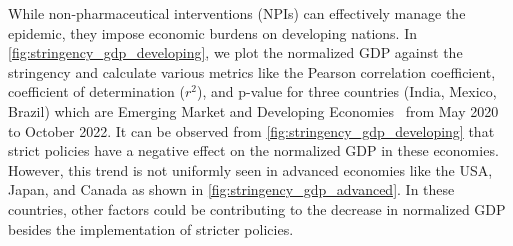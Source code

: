 \documentclass[tikz,fleqn,12pt]{wlscirep}
\begin{document}
While non-pharmaceutical interventions (NPIs) can effectively manage the epidemic, they impose economic burdens on developing nations. In \cref{fig:stringency_gdp_developing}, we plot the normalized GDP against the stringency and calculate various metrics like the Pearson correlation coefficient, coefficient of determination ($r^2$), and p-value for three countries (India, Mexico, Brazil) which are Emerging Market and Developing Economies~\cite{IMFCovid} from May 2020 to October 2022. It can be observed from \cref{fig:stringency_gdp_developing} that strict policies have a negative effect on the normalized GDP in these economies. However, this trend is not uniformly seen in advanced economies like the USA, Japan, and Canada as shown in \cref{fig:stringency_gdp_advanced}. In these countries, other factors could be contributing to the decrease in normalized GDP besides the implementation of stricter policies.
\end{document}
